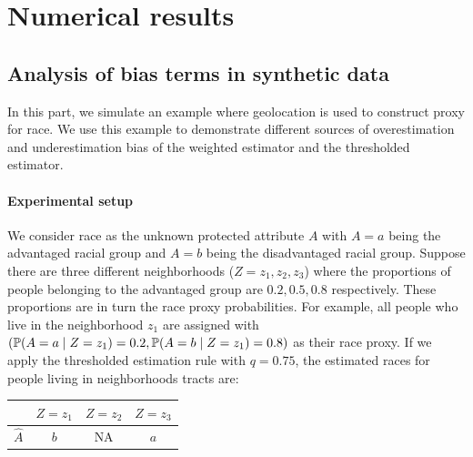 \section{Numerical results}
\label{sec:numerics}

\subsection{Analysis of bias terms in synthetic data}

In this part, we simulate an example where geolocation is used to construct proxy for race. We use this example to demonstrate different sources of overestimation and underestimation bias of the weighted estimator and the thresholded estimator.

\paragraph{Experimental setup}
We consider race as the unknown protected attribute $A$ with $A = a$ being the advantaged racial group and $A = b$ being the disadvantaged racial group. Suppose there are three different neighborhoods ($Z = z_1, z_2, z_3$) where the proportions of people belonging to the advantaged group are $0.2, 0.5, 0.8$ respectively. These proportions are in turn the race proxy probabilities. For example, all people who live in the neighborhood $z_1$ are assigned with $(\mathbb{P} (A = a \mid Z = z_1) = 0.2, \mathbb{P} (A = b \mid Z = z_1)  = 0.8)$ as their race proxy. If we apply the thresholded estimation rule with $q = 0.75$, the estimated races for people living in neighborhoods tracts are:
\begin{center}
\begin{tabular}{|c||c|c|c|}
\hline
 & $Z=z_{1}$ & $Z=z_{2}$ & $Z=z_{3}$\tabularnewline
\hline
\hline
$\hat{A}$ & $b$ & NA & $a$\tabularnewline
\hline
\end{tabular}
\end{center}

